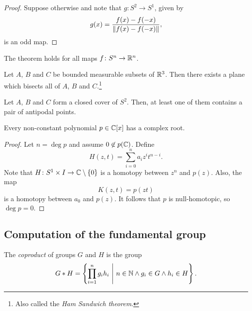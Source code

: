 \begin{proof}
Suppose otherwise and note that $g \colon S^2 \to S^1$, given by
\[
g(x) = \frac{f(x) - f(-x)}{\left\lVert f(x) - f(-x)\right\rVert},
\]
is an odd map.
\end{proof}

\begin{opomba}
The theorem holds for all maps $f \colon S^n \to \mathbb{R}^n$.
\end{opomba}

\begin{izrek}
Let $A$, $B$ and $C$ be bounded measurable subsets of $\mathbb{R}^3$. Then
there exists a plane which bisects all of $A$, $B$ and
$C$.\footnote{Also called the \emph{Ham Sandwich theorem}.}
\end{izrek}

\begin{izrek}
Let $A$, $B$ and $C$ form a closed cover of $S^2$. Then, at least
one of them contains a pair of antipodal points.
\end{izrek}

\begin{izrek}
Every non-constant polynomial $p \in \mathbb{C}[x]$ has a complex root.
\end{izrek}

\begin{proof}
Let $n = \deg p$ and assume $0 \not \in p(\mathbb{C})$. Define
\[
H(z, t) = \sum_{i=0}^n a_i z^i t^{n-i}.
\]
Note that $H \colon S^1 \times I \to \mathbb{C} \setminus \left\{0\right\}$ is a
homotopy between $z^n$ and $p(z)$. Also, the map
\[
K(z, t) = p(zt)
\]
is a homotopy between $a_0$ and $p(z)$. It follows that $p$ is
null-homotopic, so $\deg p = 0$.
\end{proof}

\newpage

\subsection{Computation of the fundamental group}


\begin{definicija}
The \emph{coproduct} of groups $G$ and $H$ is the
group
\[
G * H =
\left\{\prod_{i=1}^n g_i h_i~\middle\vert~n \in \mathbb{N} \land g_i \in G \land h_i \in H\right\}.
\]
\end{definicija}

